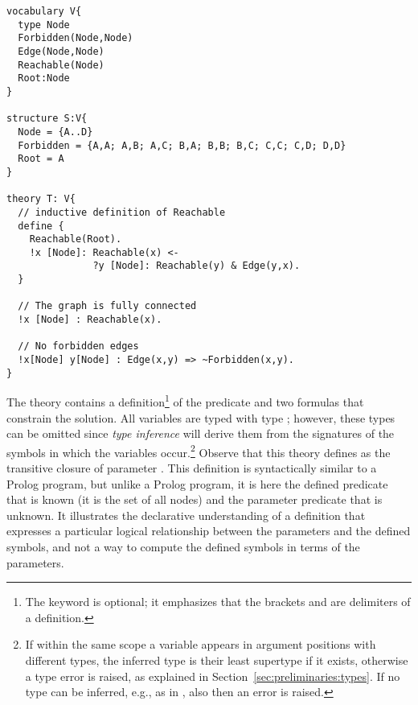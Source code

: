 \begin{lstlisting}
vocabulary V{
  type Node
  Forbidden(Node,Node)
  Edge(Node,Node)
  Reachable(Node)
  Root:Node
}

structure S:V{
  Node = {A..D}
  Forbidden = {A,A; A,B; A,C; B,A; B,B; B,C; C,C; C,D; D,D}
  Root = A
}

theory T: V{
  // inductive definition of Reachable
  define {
    Reachable(Root).
    !x [Node]: Reachable(x) <- 
               ?y [Node]: Reachable(y) & Edge(y,x).
  }

  // The graph is fully connected
  !x [Node] : Reachable(x).

  // No forbidden edges
  !x[Node] y[Node] : Edge(x,y) => ~Forbidden(x,y).
}

\end{lstlisting}
The theory contains a definition\footnote{The  keyword is optional; it emphasizes that the brackets  and  are delimiters of a definition.}   of the  predicate and
two formulas that constrain the solution. All variables are typed with
type ; however, these types can be omitted since
\emph{type inference} will derive them from the signatures of the symbols  in which the variables occur.\footnote{If within the same scope a variable appears in argument positions with different types, the inferred type is their least supertype if it exists, otherwise a type error is raised, as explained in
Section~\ref{sec:preliminaries:types}. If no type  can be inferred, e.g., as in , also then an error is raised.} Observe that this theory  defines  as the transitive closure of  parameter . This definition is syntactically similar to a Prolog program, but unlike  a Prolog program, it is here the defined predicate that is known (it is the set of all nodes) and the parameter predicate that is unknown. It illustrates the declarative understanding of  a definition that  expresses a particular logical relationship between the parameters and the defined symbols, and not a way to compute the defined symbols in terms of the parameters. 



